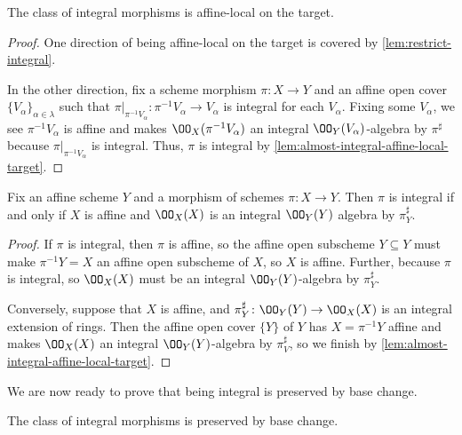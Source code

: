 \documentclass[../notes.tex]{subfiles}
\begin{document}
\begin{corollary} \label{cor:integral-affine-local-target}
	The class of integral morphisms is affine-local on the target.
\end{corollary}
\begin{proof}
	One direction of being affine-local on the target is covered by \autoref{lem:restrict-integral}.

	In the other direction, fix a scheme morphism $\pi\colon X\to Y$ and an affine open cover $\{V_\alpha\}_{\alpha\in\lambda}$ such that $\pi|_{\pi^{-1}V_\alpha}\colon\pi^{-1}V_\alpha\to V_\alpha$ is integral for each $V_\alpha$. Fixing some $V_\alpha$, we see $\pi^{-1}V_\alpha$ is affine and makes $\OO_X(\pi^{-1}V_\alpha)$ an integral $\OO_Y(V_\alpha)$-algebra by $\pi^\sharp$ because $\pi|_{\pi^{-1}V_\alpha}$ is integral. Thus, $\pi$ is integral by \autoref{lem:almost-integral-affine-local-target}.
\end{proof}
\begin{corollary} \label{cor:affine-integral-condition}
	Fix an affine scheme $Y$ and a morphism of schemes $\pi\colon X\to Y$. Then $\pi$ is integral if and only if $X$ is affine and $\OO_X(X)$ is an integral $\OO_Y(Y)$ algebra by $\pi^\sharp_Y$.
\end{corollary}
\begin{proof}
	If $\pi$ is integral, then $\pi$ is affine, so the affine open subscheme $Y\subseteq Y$ must make $\pi^{-1}Y=X$ an affine open subscheme of $X$, so $X$ is affine. Further, because $\pi$ is integral, so $\OO_X(X)$ must be an integral $\OO_Y(Y)$-algebra by $\pi^\sharp_Y$.

	Conversely, suppose that $X$ is affine, and $\pi^\sharp_Y\colon\OO_Y(Y)\to\OO_X(X)$ is an integral extension of rings. Then the affine open cover $\{Y\}$ of $Y$ has $X=\pi^{-1}Y$ affine and makes $\OO_X(X)$ an integral $\OO_Y(Y)$-algebra by $\pi^\sharp_V$, so we finish by \autoref{lem:almost-integral-affine-local-target}.
\end{proof}
We are now ready to prove that being integral is preserved by base change.
\begin{lemma} \label{lem:integral-base-change}
	The class of integral morphisms is preserved by base change.
\end{lemma}
\end{document}
